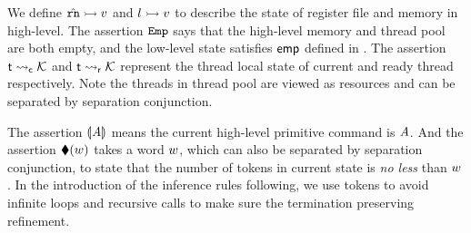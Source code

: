 We define ${\hat{\texttt{rn}}} \rightarrowtail {v}$ and ${l} \rightarrowtail {v}$
to describe the state of
register file and memory in high-level.
The assertion $\texttt{Emp}$
says that the high-level memory and thread pool are
both empty, and the low-level state satisfies $\textsf{emp}$
defined in \Fig{\ref{fig:Semantics of Assertions}}.
The assertion ${\textsf{t}} \leadsto_{\textsf{c}} {\mathcal{K}}$
and ${\textsf{t}} \leadsto_{\textsf{r}} {\mathcal{K}}$ represent
the thread local state of current and ready
thread respectively. Note the threads in thread pool
are viewed as resources and can be separated by
separation conjunction.

The assertion $\llparenthesis {\textit{A}} \rrparenthesis$ means the
current high-level primitive command is $\textit{A}$.
And the assertion $\blacklozenge({w})$ takes a word $w$,
which can also be separated by separation conjunction,
to state that the number of tokens in current state is
\textit{no less} than $w$. In the
introduction of the inference rules following, we use tokens
to avoid infinite loops and recursive calls to make sure
the termination preserving refinement.

